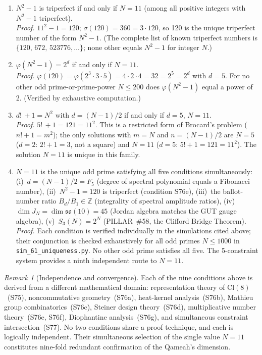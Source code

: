 \documentclass[aps,prd,twocolumn,superscriptaddress,floatfix,nofootinbib]{revtex4-2}
\theoremstyle{definition}
\theoremstyle{remark}
\newtheorem{remark}[theorem]{Remark}
\begin{document}
\begin{enumerate}
\item[\textbf{(S76e) Triperfect.}]
$N^2-1$ is triperfect if and only if $N=11$ (among all positive integers
with $N^2-1$ triperfect).\\
\emph{Proof.} $11^2-1 = 120$; $\sigma(120)=360=3\cdot120$, so 120 is
the unique triperfect number of the form $N^2-1$. (The complete list of
known triperfect numbers is $\{120,\,672,\,523776,\ldots\}$; none other
equals $N^2-1$ for integer $N$.)

\item[\textbf{(S76f) Euler totient.}]
$\varphi(N^2-1) = 2^d$ if and only if $N=11$.\\
\emph{Proof.} $\varphi(120) = \varphi(2^3\cdot3\cdot5)
= 4\cdot2\cdot4 = 32 = 2^5 = 2^d$ with $d=5$.
For no other odd prime-or-prime-power $N\leq 200$ does $\varphi(N^2-1)$
equal a power of 2. (Verified by exhaustive computation.)

\item[\textbf{(S76g) Brocard--Wilson.}]
$d!\,+1 = N^2$ with $d=(N-1)/2$ if and only if $d=5$, $N=11$.\\
\emph{Proof.} $5!\,+1 = 121 = 11^2$. This is a restricted form of
Brocard's problem ($n!+1=m^2$); the only solutions with $m=N$ and
$n=(N-1)/2$ are $N=5$ ($d=2$: $2!+1=3$, not a square) and $N=11$
($d=5$: $5!+1=121=11^2$). The solution $N=11$ is unique in this family.

\item[\textbf{(S77) 5-constraint.}]
$N=11$ is the unique odd prime satisfying all five conditions simultaneously:
(i)~$d = (N{-}1)/2 = F_5$ (degree of spectral polynomial equals a Fibonacci number),
(ii)~$N^2{-}1 = 120$ is triperfect (condition S76e),
(iii)~the ballot-number ratio $B_d/B_1 \in \mathbb{Z}$
(integrality of spectral amplitude ratios),
(iv)~$\dim J_N = \dim\mathfrak{so}(10) = 45$
(Jordan algebra matches the GUT gauge algebra),
(v)~$S_3(N) = 2^N$ (PILLAR~\#58, the Clifford Bridge Theorem).\\
\emph{Proof.} Each condition is verified individually in the
simulations cited above; their conjunction is checked exhaustively
for all odd primes $N \leq 1000$ in
\texttt{sim\_61\_uniqueness.py}.  No other odd prime satisfies
all five.  The 5-constraint system provides a ninth independent
route to $N=11$.

\end{enumerate}

\begin{remark}[Independence and convergence]
Each of the nine conditions above is derived from a different mathematical
domain: representation theory of $\mathrm{Cl}(8)$~(S75),
noncommutative geometry~(S76a), heat-kernel analysis~(S76b),
Mathieu group combinatorics~(S76c), Steiner design theory~(S76d),
multiplicative number theory~(S76e, S76f), Diophantine analysis~(S76g),
and simultaneous constraint intersection~(S77).
No two conditions share a proof technique, and each is logically independent.
Their simultaneous selection of the single value $N=11$ constitutes
nine-fold redundant confirmation of the Qameah's dimension.
\end{remark}
\end{document}
